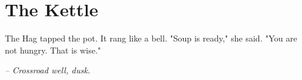 \chapter*{The Kettle}

The Hag tapped the pot. It rang like a bell. "Soup is ready," she said. "You are not hungry. That is wise."

\smallskip

\noindent \textit{-- Crossroad well, dusk.}

